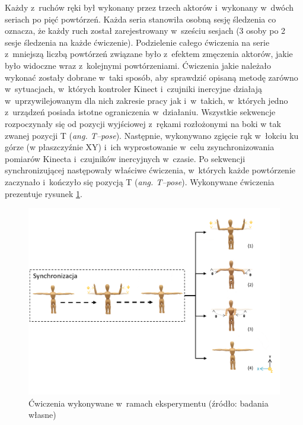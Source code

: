 Każdy z~ruchów ręki był wykonany przez trzech aktorów i~wykonany w~dwóch seriach po pięć powtórzeń. Każda seria stanowiła osobną sesję śledzenia co oznacza, że każdy ruch został zarejestrowany w~sześciu sesjach (3 osoby po 2 sesje śledzenia na każde ćwiczenie). Podzielenie całego ćwiczenia na serie z~mniejszą liczbą powtórzeń związane było z~efektem zmęczenia aktorów, jakie było widoczne wraz z~kolejnymi powtórzeniami. Ćwiczenia jakie należało wykonać zostały dobrane w~taki sposób, aby sprawdzić opisaną metodę zarówno w~sytuacjach, w~których kontroler Kinect i~czujniki inercyjne działają w~uprzywilejowanym dla nich zakresie pracy jak i~w~takich, w~których jedno z~urządzeń posiada istotne ograniczenia w~działaniu. Wszystkie sekwencje rozpoczynały się od pozycji wyjściowej z~rękami rozłożonymi na boki w tak zwanej pozycji T (\emph{ang. T--pose}). Następnie, wykonywano zgięcie rąk w~łokciu ku górze (w płaszczyźnie XY) i~ich wyprostowanie w~celu zsynchronizowania pomiarów Kinecta i~czujników inercyjnych w~czasie. Po sekwencji synchronizującej następowały właściwe ćwiczenia, w~których każde powtórzenie zaczynało i~kończyło się pozycją T (\emph{ang. T--pose}). Wykonywane ćwiczenia prezentuje rysunek \ref{fig:experiments:poses}.
				
\begin{savenotes}
	\begin{figure}[!htb]
		\centering
		\includegraphics[width=\textwidth]{images/poses.png}
		\caption{Ćwiczenia wykonywane w~ramach eksperymentu  (źródło: badania własne)}
		\label{fig:experiments:poses}
	\end{figure}
\end{savenotes}
						
